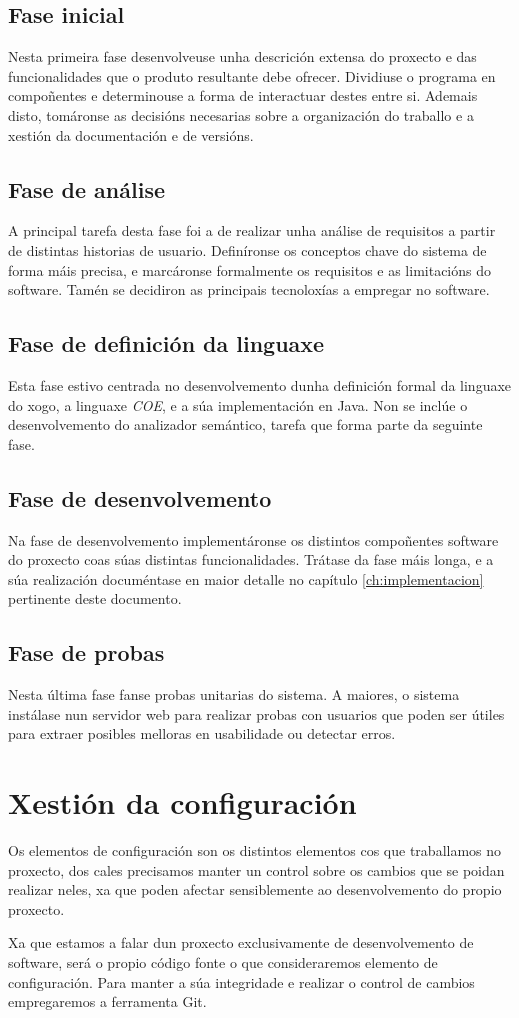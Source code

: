 \subsection{Fase inicial}
Nesta primeira fase desenvolveuse unha descrición extensa do proxecto e das
funcionalidades que o produto resultante debe ofrecer. Dividiuse o programa en
compoñentes e determinouse a forma de interactuar destes entre si. Ademais
disto, tomáronse as decisións necesarias sobre a organización do traballo e a
xestión da documentación e de versións.

\subsection{Fase de análise}
A principal tarefa desta fase foi a de realizar unha análise de requisitos a
partir de distintas historias de usuario. Definíronse os conceptos chave do
sistema de forma máis precisa, e marcáronse formalmente os requisitos e as
limitacións do software. Tamén se decidiron as principais tecnoloxías a
empregar no software.

\subsection{Fase de definición da linguaxe}
Esta fase estivo centrada no desenvolvemento dunha definición formal da linguaxe
do xogo, a linguaxe {\it COE}, e a súa implementación en Java. Non se inclúe o
desenvolvemento do analizador semántico, tarefa que forma parte da seguinte
fase.

\subsection{Fase de desenvolvemento}
Na fase de desenvolvemento implementáronse os distintos compoñentes software do
proxecto coas súas distintas funcionalidades. Trátase da fase máis longa, e a
súa realización documéntase en maior detalle no capítulo \ref{ch:implementacion}
pertinente deste documento.

\subsection{Fase de probas}
Nesta última fase fanse probas unitarias do sistema. A maiores, o sistema
instálase nun servidor web para realizar probas con usuarios que poden ser
útiles para extraer posibles melloras en usabilidade ou detectar erros. 

\section{Xestión da configuración}
Os elementos de configuración son os distintos elementos cos que traballamos no
proxecto, dos cales precisamos manter un control
sobre os cambios que se poidan realizar neles, xa que poden afectar
sensiblemente ao desenvolvemento do propio proxecto.
\par
Xa que estamos a falar dun proxecto exclusivamente de desenvolvemento de
software, será o propio código fonte o que consideraremos elemento de
configuración. Para manter a súa integridade e realizar o control de cambios
empregaremos a ferramenta Git.

